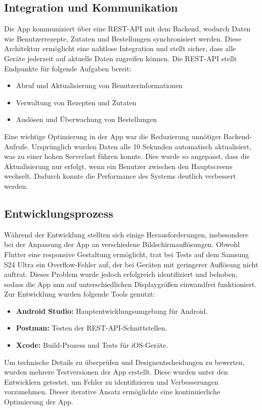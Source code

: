 \subsection{Integration und Kommunikation}
Die App kommuniziert über eine REST-API mit dem Backend, wodurch Daten wie Benutzerrezepte, Zutaten und Bestellungen synchronisiert werden. Diese Architektur ermöglicht eine nahtlose Integration und stellt sicher, dass alle Geräte jederzeit auf aktuelle Daten zugreifen können. Die REST-API stellt Endpunkte für folgende Aufgaben bereit:

\begin{itemize}
    \item Abruf und Aktualisierung von Benutzerinformationen
    \item Verwaltung von Rezepten und Zutaten
    \item Auslösen und Überwachung von Bestellungen
\end{itemize}
Eine wichtige Optimierung in der App war die Reduzierung unnötiger Backend-Aufrufe. Ursprünglich wurden Daten alle 10 Sekunden automatisch aktualisiert, was zu einer hohen Serverlast führen konnte. Dies wurde so angepasst, dass die Aktualisierung nur erfolgt, wenn ein Benutzer zwischen den Hauptscreens wechselt. Dadurch konnte die Performance des Systems deutlich verbessert werden.

\subsection{Entwicklungsprozess}
Während der Entwicklung stellten sich einige Herausforderungen, insbesondere bei der Anpassung der App an verschiedene Bildschirmauflösungen. Obwohl Flutter eine responsive Gestaltung ermöglicht, trat bei Tests auf dem Samsung S24 Ultra ein Overflow-Fehler auf, der bei Geräten mit geringerer Auflösung nicht auftrat. Dieses Problem wurde jedoch erfolgreich identifiziert und behoben, sodass die App nun auf unterschiedlichen Displaygrößen einwandfrei funktioniert.
Zur Entwicklung wurden folgende Tools genutzt:

\begin{itemize}
    \item \textbf{Android Studio:} Hauptentwicklungsumgebung für Android.
    \item \textbf{Postman:} Testen der REST-API-Schnittstellen.
    \item \textbf{Xcode:} Build-Prozess und Tests für iOS-Geräte.
\end{itemize}
Um technische Details zu überprüfen und Designentscheidungen zu bewerten, wurden mehrere Testversionen der App erstellt. Diese wurden unter den Entwicklern getestet, um Fehler zu identifizieren und Verbesserungen vorzunehmen. Dieser iterative Ansatz ermöglichte eine kontinuierliche Optimierung der App.

